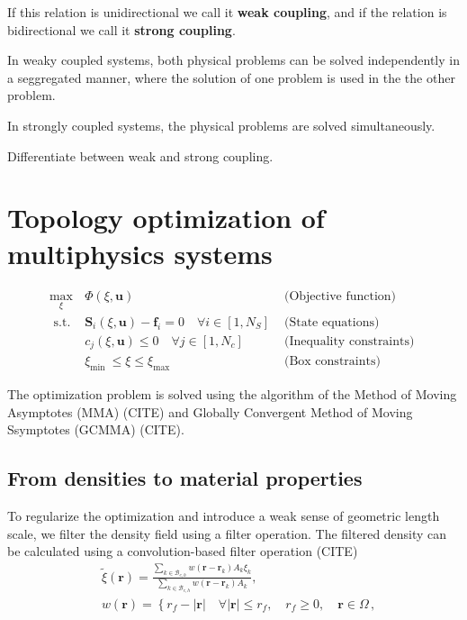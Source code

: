  If this relation is unidirectional
we call it \textbf{weak coupling}, and if the relation is bidirectional we call it 
\textbf{strong coupling}.

In weaky coupled systems, both physical problems can be solved independently in a seggregated 
manner, where the solution of one problem is used in the the other problem.

In strongly coupled systems, the physical problems are solved simultaneously.

Differentiate between weak and strong coupling.

\section{Topology optimization of multiphysics systems}

\begin{equation}
    \begin{array}{clr}
    \max\limits_{\xi} & \Phi(\xi, \mathbf{u}) & \text { (Objective function) } \\
    \text { s.t. } & \mathbf{S}_i(\xi, \mathbf{u})-\mathbf{f}_i=0 \quad \forall i \in\left[1, N_S\right] & \text { (State equations) } \\
    & c_j(\xi, \mathbf{u}) \leq 0 \quad \forall j \in\left[1, N_c\right] & \text { (Inequality constraints) } \\
    & \xi_{\text {min }} \leq \xi \leq \xi_{\text {max }} & \text { (Box constraints) }
    \end{array}
\end{equation}

The optimization problem is solved using the algorithm of the Method of Moving
Asymptotes (MMA) (CITE) and Globally Convergent Method of Moving Ssymptotes (GCMMA) (CITE).

\subsection{From densities to material properties}

To regularize the optimization and introduce a weak sense of geometric length scale, we filter
the density field using a filter operation. The filtered density can be calculated using a 
convolution-based filter operation (CITE)
\begin{equation}
    \begin{aligned}
    & \tilde{\xi}(\mathbf{r})=\frac{\sum_{k \in \mathcal{B}_{e, h}} w\left(\mathbf{r}-\mathbf{r}_k\right) A_k \xi_k}{\sum_{k \in \mathcal{B}_{e, h}} w\left(\mathbf{r}-\mathbf{r}_k\right) A_k}, \\
    & w(\mathbf{r})=\left\{r_f-|\mathbf{r}| \quad \forall|\mathbf{r}| \leq r_f, \quad r_f \geq 0, \quad \mathbf{r} \in \Omega\right.\,,
    \end{aligned}
\end{equation}

